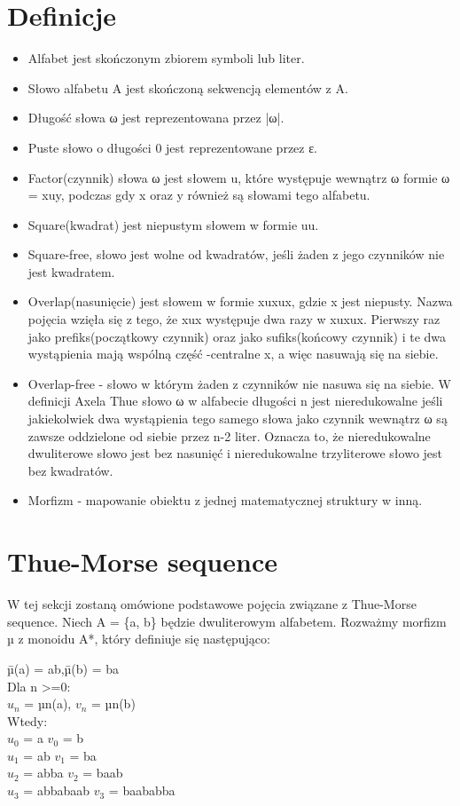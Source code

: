 \documentclass[document]{xmgr}
\begin{document}
\section{Definicje}
\begin{itemize}
\item Alfabet jest skończonym zbiorem symboli lub liter.
\item Słowo alfabetu A jest skończoną sekwencją elementów z A. 
\item Długość słowa ω jest reprezentowana przez |ω|.
\item Puste słowo o długości 0 jest reprezentowane przez ε.
\item Factor(czynnik) słowa ω jest słowem u, które występuje wewnątrz ω formie ω = xuy, podczas gdy x oraz y również są słowami tego alfabetu.
\item Square(kwadrat) jest niepustym słowem w formie uu.
\item Square-free, słowo jest wolne od kwadratów, jeśli żaden z jego czynników nie jest kwadratem.
\item Overlap(nasunięcie) jest słowem w formie xuxux, gdzie x jest niepusty. Nazwa pojęcia wzięła się z tego, że xux występuje dwa razy w xuxux. Pierwszy raz jako prefiks(początkowy czynnik) oraz jako sufiks(końcowy czynnik) i te dwa wystąpienia mają wspólną część -centralne x, a więc nasuwają się na siebie.
\item Overlap-free - słowo w którym żaden z czynników nie nasuwa się na siebie.
W definicji Axela Thue słowo ω w alfabecie długości n jest nieredukowalne jeśli jakiekolwiek dwa wystąpienia tego samego słowa jako czynnik wewnątrz ω są zawsze oddzielone od siebie przez n-2 liter. Oznacza to, że nieredukowalne dwuliterowe słowo jest bez nasunięć i nieredukowalne trzyliterowe słowo jest bez kwadratów.
\item Morfizm - mapowanie obiektu z jednej matematycznej struktury w inną.
\end{itemize}



\section{Thue-Morse sequence}
W tej sekcji zostaną omówione podstawowe pojęcia związane z Thue-Morse sequence.
Niech A = \{a, b\} będzie dwuliterowym alfabetem. Rozważmy morfizm µ z monoidu A*, który definiuje się następująco:

\begin{tabbing}

\hspace{8em}\= µ(a) = ab,\hspace{7em}\= µ(b) = ba\\
Dla n >=0:\\
\> $u_n$ = µn(a),\> $v_n$ = µn(b)\\
Wtedy:\\
\> $u_0$ = a \> $v_0$ = b\\
\> $u_1$ = ab \> $v_1$ = ba\\
\> $u_2$ = abba	 \> $v_2$ = baab\\
\> $u_3$ = abbabaab	 \> $v_3$ = baababba
\end{tabbing}
\end{document}
